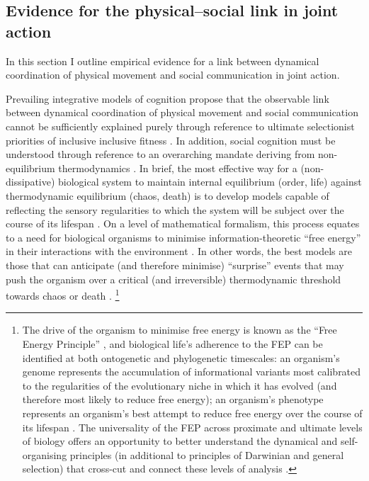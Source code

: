 \begin{CJK}{UTF8}{gbsn}
\subsection{Evidence for the physical--social link in joint action}
In this section I outline empirical evidence for a link between dynamical coordination of physical movement and social communication in joint action.




Prevailing integrative models of cognition propose that the observable link between dynamical coordination of physical movement and social communication cannot be sufficiently explained purely through reference to ultimate selectionist priorities of inclusive inclusive fitness \citep{Badcock2012}.  In addition, social cognition must be understood through reference to an overarching mandate deriving from non-equilibrium thermodynamics \citep{Schrodinger1944}.  In brief, the most effective way for a (non-dissipative) biological system to maintain internal equilibrium (order, life) against thermodynamic equilibrium (chaos, death) is to develop models capable of reflecting the sensory regularities to which the system will be subject over the course of its lifespan \citep{Conant1970,Yufik2016}. On a level of mathematical formalism, this process equates to a need for biological organisms to minimise information-theoretic ``free energy'' in their interactions with the environment \citep{Friston2006,Ramstead2017,Yufik2017}.  In other words, the best models are those that can anticipate (and therefore minimise) ``surprise'' events that may push the organism over a critical (and irreversible) thermodynamic threshold towards chaos or death \citep[here surprise can be understood as a rough equivalent of free energy, see][]{Friston2013}.
  \footnote{The drive of the organism to minimise free energy is known as the ``Free Energy Principle'' \citep[hereafter FEP; see][]{Friston2010}, and biological life's adherence to the FEP can be identified at both ontogenetic and phylogenetic timescales: an organism's genome represents the accumulation of informational variants most calibrated to the regularities of the evolutionary niche in which it has evolved (and therefore most likely to reduce free energy); an organism's phenotype represents an organism's best attempt to reduce free energy over the course of its lifespan \citep{Ramstead2017}.  The universality of the FEP across proximate and ultimate levels of biology offers an opportunity to better understand the dynamical and self-organising principles (in additional to principles of Darwinian and general selection) that cross-cut and connect these levels of analysis \citep{Caporael2001,Badcock2012,Laland2015,Ramstead2017}.}


\end{CJK}
